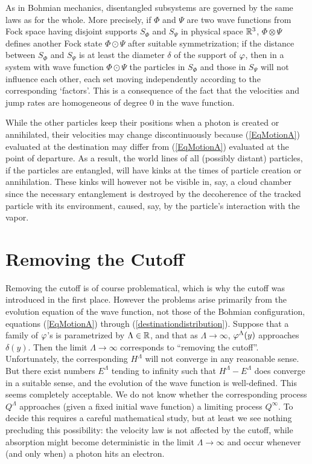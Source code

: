 \documentclass[12pt]{article}
\begin{document}
As in Bohmian mechanics, disentangled subsystems are governed by the same
laws as for the whole. More precisely, if $\Phi$ and $\Psi$ are two wave
functions from Fock space having disjoint supports $S_\Phi$ and $S_\Psi$ in
physical space $\mathbb{R}^3$, $\Phi\otimes\Psi$ defines another Fock state $\Phi
\odot \Psi$ after suitable symmetrization; if the distance between $S_\Phi$
and $S_\Psi$ is at least the diameter $\delta$ of the support of
$\varphi$, then in a system with wave function $\Phi\odot \Psi$ the
particles in $S_\Phi$ and those in $S_\Psi$ will not influence each other,
each set moving independently according to the corresponding
`factors'. This is a consequence of the fact that the velocities and jump
rates are homogeneous of degree 0 in the wave function.

While the other particles keep their positions when a photon is created or
annihilated, their velocities may change discontinuously because
(\ref{EqMotionA}) evaluated at the destination may differ from
(\ref{EqMotionA}) evaluated at the point of departure. As a result, the
world lines of all (possibly distant) particles, if the particles are
entangled, will have kinks at the times of particle creation or
annihilation. These kinks will however not be visible in, say, a cloud
chamber since the necessary entanglement is destroyed by the decoherence
of the tracked particle with its environment, caused, say, by the particle's
interaction with the vapor.


\section{Removing the Cutoff}

Removing the cutoff is of course problematical, which is why the cutoff was
introduced in the first place. However the problems arise primarily from
the evolution equation of the wave function, not those of the Bohmian
configuration, equations (\ref{EqMotionA}) through
(\ref{destinationdistribution}). Suppose that a family of $\varphi$'s is
parametrized by $\Lambda\in\mathbb{R}$, and that as $\Lambda\to\infty$,
$\varphi^\Lambda(y)$ approaches $\delta(y)$.  Then the limit
$\Lambda\to\infty$ corresponds to ``removing the cutoff''. Unfortunately,
the corresponding $H^\Lambda$ will not converge in any reasonable
sense. But there exist numbers $E^\Lambda$ tending to infinity
\cite{Nelson} such that $H^\Lambda - E^\Lambda$ does converge in a suitable
sense, and the evolution of the wave function is well-defined. This seems
completely acceptable. We do not know whether the corresponding process
$Q^\Lambda$ approaches (given a fixed initial wave function) a limiting
process $Q^\infty$. To decide this requires a careful mathematical study,
but at least we see nothing precluding this possibility: the velocity law 
is not affected by the cutoff, while absorption might become deterministic 
in the limit $\Lambda\to\infty$ and occur whenever (and only when) a photon
hits an electron.
\end{document}
